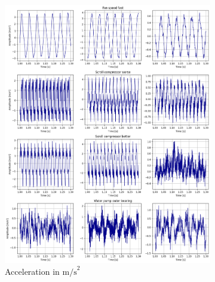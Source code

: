\begin{figure}[ht]
    \centering
    \begin{subfigure}[b]{0.49\textwidth}
        \includegraphics[width=\textwidth]{assets/design/EDA-custom-dataset-temporal.png}
        \caption{Acceleration in $\mathrm{m/s}^2$}
    \end{subfigure}
    \hfill
    \begin{subfigure}[b]{0.49\textwidth}

\end{subfigure}
\end{figure}
